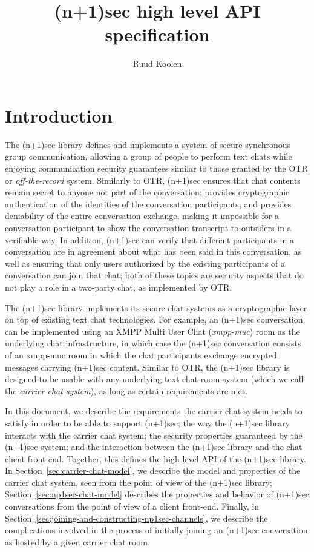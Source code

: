 \documentclass{article}
\title{(n+1)sec high level API specification}
\author{Ruud Koolen}
\begin{document}
\maketitle

\section{Introduction}
\label{sec:introduction}

The (n+1)sec library defines and implements a system of secure synchronous group communication, allowing a group of people to perform text chats while enjoying communication security guarantees similar to those granted by the OTR or \emph{off-the-record} system.
Similarly to OTR, (n+1)sec ensures that chat contents remain secret to anyone not part of the conversation; provides cryptographic authentication of the identities of the conversation participants; and provides deniability of the entire conversation exchange, making it impossible for a conversation participant to show the conversation transcript to outsiders in a verifiable way.
In addition, (n+1)sec can verify that different participants in a conversation are in agreement about what has been said in this conversation, as well as ensuring that only users authorized by the existing participants of a conversation can join that chat; both of these topics are security aspects that do not play a role in a two-party chat, as implemented by OTR.

The (n+1)sec library implements its secure chat systems as a cryptographic layer on top of existing text chat technologies.
For example, an (n+1)sec conversation can be implemented using an XMPP Multi User Chat (\emph{xmpp-muc}) room as the underlying chat infrastructure, in which case the (n+1)sec conversation consists of an xmpp-muc room in which the chat participants exchange encrypted messages carrying (n+1)sec content.
Similar to OTR, the (n+1)sec library is designed to be usable with any underlying text chat room system (which we call the \emph{carrier chat system}), as long as certain requirements are met.

In this document, we describe the requirements the carrier chat system needs to satisfy in order to be able to support (n+1)sec; the way the (n+1)sec library interacts with the carrier chat system; the security properties guaranteed by the (n+1)sec system; and the interaction between the (n+1)sec library and the chat client front-end.
Together, this defines the high level API of the (n+1)sec library.
In Section~\ref{sec:carrier-chat-model}, we describe the model and properties of the carrier chat system, seen from the point of view of the (n+1)sec library; Section~\ref{sec:np1sec-chat-model} describes the properties and behavior of (n+1)sec conversations from the point of view of a client front-end.
Finally, in Section~\ref{sec:joining-and-constructing-np1sec-channels}, we describe the complications involved in the process of initially joining an (n+1)sec conversation as hosted by a given carrier chat room.
\end{document}
